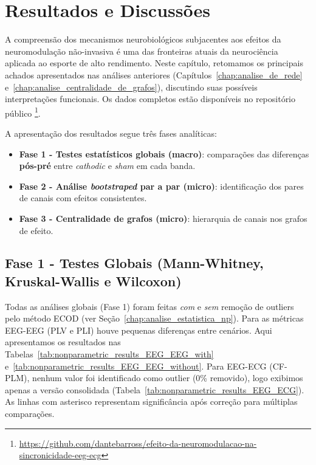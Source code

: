 \chapter{Resultados e Discussões}
\label{chap:resultados_e_discussoes}

A compreensão dos mecanismos neurobiológicos subjacentes aos efeitos da neuromodulação não-invasiva é uma das fronteiras atuais da neurociência aplicada ao esporte de alto rendimento. Neste capítulo, retomamos os principais achados apresentados nas análises anteriores (Capítulos~\ref{chap:analise_de_rede} e~\ref{chap:analise_centralidade_de_grafos}), discutindo suas possíveis interpretações funcionais. Os dados completos estão disponíveis no repositório público \cite{barros2025repository}\footnote{\url{https://github.com/dantebarross/efeito-da-neuromodulacao-na-sincronicidade-eeg-ecg}}.

A apresentação dos resultados segue três fases analíticas:

\begin{itemize}
  \item \textbf{Fase 1 - Testes estatísticos globais (macro)}: comparações das diferenças \textbf{pós-pré} entre \textit{cathodic} e \textit{sham} em cada banda.
  \item \textbf{Fase 2 - Análise \textit{bootstraped} par a par (micro)}: identificação dos pares de canais com efeitos consistentes.
  \item \textbf{Fase 3 - Centralidade de grafos (micro)}: hierarquia de canais nos grafos de efeito.
\end{itemize}

\section{Fase 1 - Testes Globais (Mann-Whitney, Kruskal-Wallis e Wilcoxon)}

Todas as análises globais (Fase 1) foram feitas \textit{com} e \textit{sem} remoção de outliers pelo método ECOD (ver Seção~\ref{chap:analise_estatistica_np}). Para as métricas EEG-EEG (PLV e PLI) houve pequenas diferenças entre cenários. Aqui apresentamos os resultados nas Tabelas~\ref{tab:nonparametric_results_EEG_EEG_with} e~\ref{tab:nonparametric_results_EEG_EEG_without}. Para EEG-ECG (CF-PLM), nenhum valor foi identificado como outlier (0\% removido), logo exibimos apenas a versão consolidada (Tabela~\ref{tab:nonparametric_results_EEG_ECG}). As linhas com asterisco representam significância após correção para múltiplas comparações.

